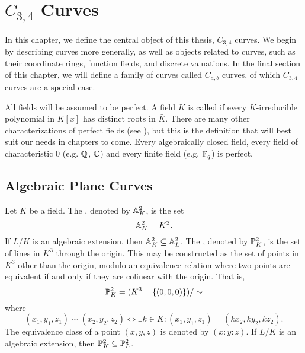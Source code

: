 
\section{$C_{3,4}$ Curves}
\label{chap_curves}

In this chapter, we define the central object of this thesis, $C_{3,4}$ curves.
We begin by describing curves more generally, as well as objects related to curves,
such as their coordinate rings, function fields, and discrete valuations.
In the final section of this chapter, we will define a family of curves called $C_{a,b}$ curves,
of which $C_{3,4}$ curves are a special case.

All fields will be assumed to be perfect.
A field $K$ is called  if every $K$-irreducible polynomial in $K[x]$
has distinct roots in $\bar K$.
There are many other characterizations of perfect fields (see \cite{hungerford}),
but this is the definition that will best suit our needs in chapters to come.
Every algebraically closed field,
every field of characteristic 0 (e.g. $\mathbb{Q}$, $\mathbb{C}$)
and every finite field (e.g. $\mathbb{F}_q$) is perfect.




\subsection{Algebraic Plane Curves}
\label{sec_plane_curves}

Let $K$ be a field.
The , denoted by $\mathbb{A}_K^2$, is the set
\[ \mathbb{A}_K^2 = K^2. \]
If $L/K$ is an algebraic extension, then $\mathbb{A}_K^2 \subseteq \mathbb{A}_L^2$.
The , denoted by $\mathbb{P}_K^2$, is the set of lines in $K^3$ through the origin.
This may be constructed as the set of points in $K^3$ other than the origin,
modulo an equivalence relation where two points are equivalent if and only if they are colinear with the origin.
That is,
\[ \mathbb{P}_K^2 = (K^3 - \{(0,0,0)\})/\sim \]
where
\[ (x_1, y_1, z_1) \sim (x_2, y_2, z_2) \iff \exists k \in K : (x_1, y_1, z_1) = (kx_2, ky_2, kz_2). \]
The equivalence class of a point $(x, y, z)$ is denoted by $(x : y : z)$.
If $L/K$ is an algebraic extension, then $\mathbb{P}_K^2 \subseteq \mathbb{P}_L^2$.

